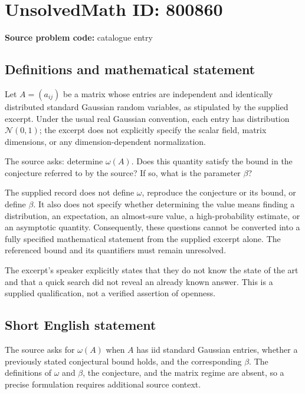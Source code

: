 \documentclass[11pt]{article}
\begin{document}
\section*{UnsolvedMath ID: 800860}
\textbf{Source problem code:} catalogue entry
\subsection{Definitions and mathematical statement}
Let \(A=(a_{ij})\) be a matrix whose entries are independent and identically distributed standard Gaussian random variables, as stipulated by the supplied excerpt. Under the usual real Gaussian convention, each entry has distribution \(\mathcal N(0,1)\); the excerpt does not explicitly specify the scalar field, matrix dimensions, or any dimension-dependent normalization.

The source asks: determine \(\omega(A)\). Does this quantity satisfy the bound in the conjecture referred to by the source? If so, what is the parameter \(\beta\)?

The supplied record does not define \(\omega\), reproduce the conjecture or its bound, or define \(\beta\). It also does not specify whether determining the value means finding a distribution, an expectation, an almost-sure value, a high-probability estimate, or an asymptotic quantity. Consequently, these questions cannot be converted into a fully specified mathematical statement from the supplied excerpt alone. The referenced bound and its quantifiers must remain unresolved.

The excerpt's speaker explicitly states that they do not know the state of the art and that a quick search did not reveal an already known answer. This is a supplied qualification, not a verified assertion of openness.
\subsection{Short English statement}
The source asks for \(\omega(A)\) when \(A\) has iid standard Gaussian entries, whether a previously stated conjectural bound holds, and the corresponding \(\beta\). The definitions of \(\omega\) and \(\beta\), the conjecture, and the matrix regime are absent, so a precise formulation requires additional source context.
\end{document}
